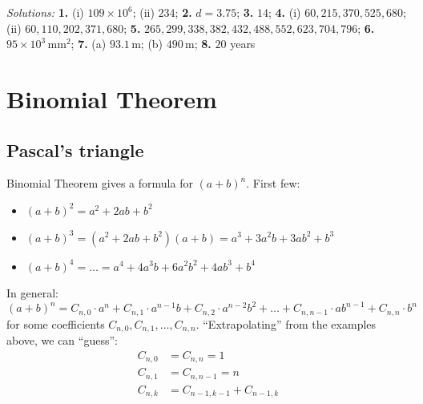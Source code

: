 \documentclass[
  english,
  12pt,
  oneside]{book}
\providecommand{\tightlist}{%
  \setlength{\itemsep}{0pt}\setlength{\parskip}{0pt}}
\theoremstyle{definition}
\theoremstyle{definition}
\theoremstyle{definition}
\theoremstyle{definition}
\theoremstyle{remark}
\begin{document}
\emph{Solutions:}
\textbf{1.} (i) \(109\times 10^6\); (ii) \(234\);
\textbf{2.} \(d=3.75\);
\textbf{3.} \(14\);
\textbf{4.} (i) \(60,215,370,525,680\); (ii) \(60,110,202,371,680\);
\textbf{5.} \(265,299,338,382,432,488,552,623,704,796\);
\textbf{6.} \(95\times 10^3\,\mathrm{mm}^2\);
\textbf{7.} (a) \(93.1\,\mathrm{m}\); (b) \(490\,\mathrm{m}\);
\textbf{8.} \(20\) years

\chapter{Binomial Theorem}\label{binomial-theorem}

\section{Pascal's triangle}\label{pascals-triangle}

Binomial Theorem gives a formula for \((a+b)^n\).
First few:

\begin{itemize}
\tightlist
\item
  \((a+b)^2 = a^2+2ab+b^2\)
\item
  \((a+b)^3 = (a^2+2ab+b^2)(a+b) = a^3+3a^2b+3ab^2+b^3\)
\item
  \((a+b)^4 = \dots = a^4+4a^3b+6a^2b^2 + 4ab^3 + b^4\)
\end{itemize}

In general:
\[(a+b)^n = C_{n,0}\cdot a^n + C_{n,1}\cdot a^{n-1}b + C_{n,2}\cdot a^{n-2}b^2 + \dots + C_{n,n-1}\cdot ab^{n-1} + C_{n,n}\cdot b^n\]
for some coefficients \(C_{n,0},C_{n,1},\dots,C_{n,n}\). ``Extrapolating'' from the examples above, we can ``guess'':
\begin{align*}
    C_{n,0} &= C_{n,n} = 1\\
    C_{n,1} &= C_{n,n-1} = n\\
    C_{n,k} &= C_{n-1,k-1}+C_{n-1,k}
\end{align*}
\end{document}
